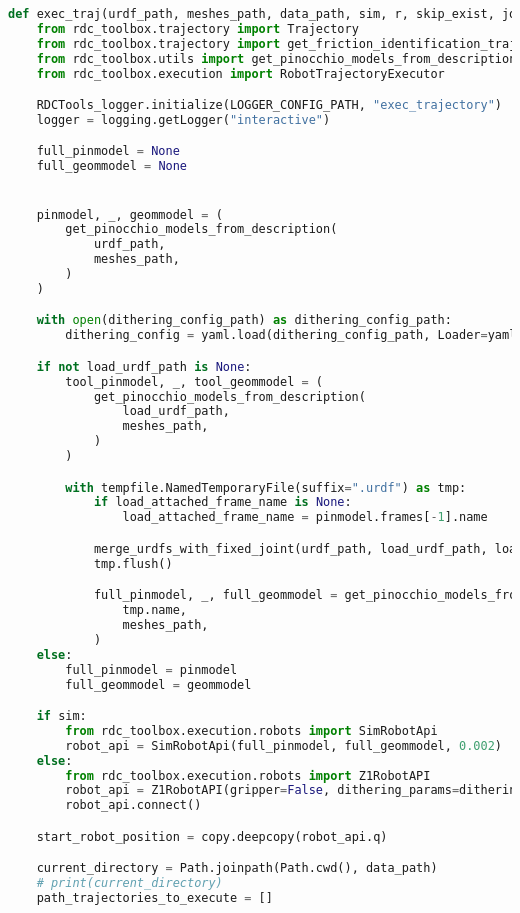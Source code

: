 \begin{lstlisting}[language=python, caption=\raggedright{execution/exec\_trajectory.py}, frame=single]
def exec_traj(urdf_path, meshes_path, data_path, sim, r, skip_exist, joint_num, type, refine_dt, check, times, load_urdf_path, load_attached_frame_name, dithering_config_path):
    from rdc_toolbox.trajectory import Trajectory
    from rdc_toolbox.trajectory import get_friction_identification_trajectories
    from rdc_toolbox.utils import get_pinocchio_models_from_description, get_robot_with_tool_pinmodel, merge_urdfs_with_fixed_joint
    from rdc_toolbox.execution import RobotTrajectoryExecutor

    RDCTools_logger.initialize(LOGGER_CONFIG_PATH, "exec_trajectory")
    logger = logging.getLogger("interactive")

    full_pinmodel = None
    full_geommodel = None


    pinmodel, _, geommodel = (
        get_pinocchio_models_from_description(
            urdf_path,
            meshes_path,
        )
    )

    with open(dithering_config_path) as dithering_config_path:
        dithering_config = yaml.load(dithering_config_path, Loader=yaml.SafeLoader)

    if not load_urdf_path is None:
        tool_pinmodel, _, tool_geommodel = (
            get_pinocchio_models_from_description(
                load_urdf_path,
                meshes_path,
            )
        )

        with tempfile.NamedTemporaryFile(suffix=".urdf") as tmp:
            if load_attached_frame_name is None:
                load_attached_frame_name = pinmodel.frames[-1].name

            merge_urdfs_with_fixed_joint(urdf_path, load_urdf_path, load_attached_frame_name, tool_pinmodel.frames[1].name, tmp.name)
            tmp.flush()

            full_pinmodel, _, full_geommodel = get_pinocchio_models_from_description(
                tmp.name,
                meshes_path,
            )
    else:
        full_pinmodel = pinmodel
        full_geommodel = geommodel

    if sim:
        from rdc_toolbox.execution.robots import SimRobotApi
        robot_api = SimRobotApi(full_pinmodel, full_geommodel, 0.002)
    else:
        from rdc_toolbox.execution.robots import Z1RobotAPI
        robot_api = Z1RobotAPI(gripper=False, dithering_params=dithering_config)
        robot_api.connect()

    start_robot_position = copy.deepcopy(robot_api.q)

    current_directory = Path.joinpath(Path.cwd(), data_path)
    # print(current_directory)
    path_trajectories_to_execute = []
    

\end{lstlisting}
